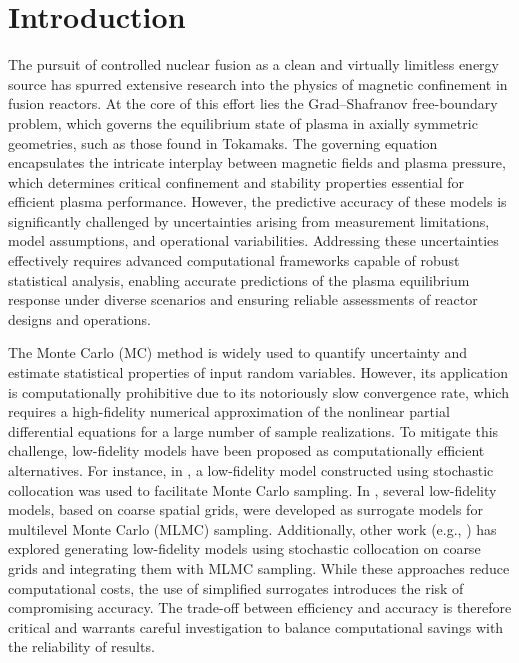 \documentclass[final,3p,times,11pt]{elsarticle}
\begin{document}
\section{Introduction}\label{sec:intro}
The pursuit of controlled nuclear fusion as a clean and virtually limitless energy source has spurred extensive research into the physics of magnetic confinement in fusion reactors. At the core of this effort lies the Grad–Shafranov free-boundary problem, which governs the equilibrium state of plasma in axially symmetric geometries, such as those found in Tokamaks. The governing equation encapsulates the intricate interplay between magnetic fields and plasma pressure, which determines critical confinement and stability properties essential for efficient plasma performance. However, the predictive accuracy of these models is significantly challenged by uncertainties arising from measurement limitations, model assumptions, and operational variabilities. Addressing these uncertainties effectively requires advanced computational frameworks capable of robust statistical analysis, enabling accurate predictions of the plasma equilibrium response under diverse scenarios and ensuring reliable assessments of reactor designs and operations.

The Monte Carlo (MC) method is widely used to quantify uncertainty and estimate statistical properties of input random variables. However, its application is computationally prohibitive due to its notoriously slow convergence rate, which requires a high-fidelity numerical approximation of the nonlinear partial differential equations for a large number of sample realizations.  To mitigate this challenge, low-fidelity models have been proposed as computationally efficient alternatives. For instance, in \cite{ElLiSa:2022}, a low-fidelity model constructed using stochastic collocation was used to facilitate Monte Carlo sampling. In \cite{ElLiSa:2023}, several low-fidelity models, based on coarse spatial grids, were developed as surrogate models for multilevel Monte Carlo (MLMC) sampling. Additionally, other work (e.g., \cite{}) has explored generating low-fidelity models using stochastic collocation on coarse grids and integrating them with MLMC sampling. While these approaches reduce computational costs, the use of simplified surrogates introduces the risk of compromising accuracy. The trade-off between efficiency and accuracy is therefore critical and warrants careful investigation to balance computational savings with the reliability of results.
\end{document}
